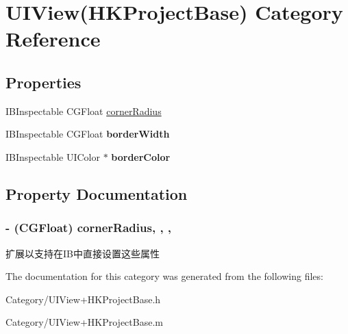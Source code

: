 \hypertarget{category_u_i_view_07_h_k_project_base_08}{\section{U\+I\+View(H\+K\+Project\+Base) Category Reference}
\label{category_u_i_view_07_h_k_project_base_08}
}
\subsection*{Properties}
\begin{DoxyCompactItemize}
\item 
I\+B\+Inspectable C\+G\+Float \hyperlink{category_u_i_view_07_h_k_project_base_08_af7127d16fde5bd7465a64e1e5bec282e}{corner\+Radius}
\item 
\hypertarget{category_u_i_view_07_h_k_project_base_08_a094b9e652612f4e47ab5c219adaf5757}{I\+B\+Inspectable C\+G\+Float {\bfseries border\+Width}}\label{category_u_i_view_07_h_k_project_base_08_a094b9e652612f4e47ab5c219adaf5757}

\item 
\hypertarget{category_u_i_view_07_h_k_project_base_08_a28f000618f60941c8847fbbe5165c5de}{I\+B\+Inspectable U\+I\+Color $\ast$ {\bfseries border\+Color}}\label{category_u_i_view_07_h_k_project_base_08_a28f000618f60941c8847fbbe5165c5de}

\end{DoxyCompactItemize}


\subsection{Property Documentation}
\hypertarget{category_u_i_view_07_h_k_project_base_08_af7127d16fde5bd7465a64e1e5bec282e}{
\subsubsection[{corner\+Radius}]{\setlength{\rightskip}{0pt plus 5cm}-\/ (C\+G\+Float) corner\+Radius\hspace{0.3cm}{\ttfamily [read]}, {\ttfamily [write]}, {\ttfamily [nonatomic]}, {\ttfamily [assign]}}}\label{category_u_i_view_07_h_k_project_base_08_af7127d16fde5bd7465a64e1e5bec282e}
扩展以支持在\+I\+B中直接设置这些属性 

The documentation for this category was generated from the following files\+:\begin{DoxyCompactItemize}
\item 
Category/U\+I\+View+\+H\+K\+Project\+Base.\+h\item 
Category/U\+I\+View+\+H\+K\+Project\+Base.\+m\end{DoxyCompactItemize}
